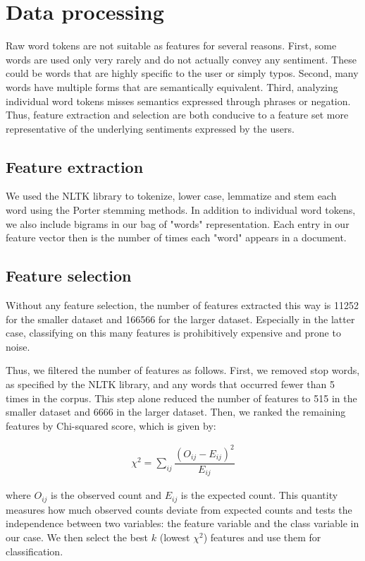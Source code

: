 \documentclass{article} %
\begin{document}
\section{Data processing}

Raw word tokens are not suitable as features for several reasons. First, some words are used only very rarely and do not actually convey any sentiment. These could be words that are highly specific to the user or simply typos. Second, many words have multiple forms that are semantically equivalent. Third, analyzing individual word tokens misses semantics expressed through phrases or negation. Thus, feature extraction and selection are both conducive to a feature set more representative of the underlying sentiments expressed by the users.

\subsection{Feature extraction}

We used the NLTK library to tokenize, lower case, lemmatize and stem each word using the Porter stemming methods. In addition to individual word tokens, we also include bigrams in our bag of "words" representation. Each entry in our feature vector then is the number of times each "word" appears in a document.

\subsection{Feature selection}

Without any feature selection, the number of features extracted this way is 11252 for the smaller dataset and 166566 for the larger dataset. Especially in the latter case, classifying on this many features is prohibitively expensive and prone to noise.

Thus, we filtered the number of features as follows. First, we removed stop words, as specified by the NLTK library, and any words that occurred fewer than 5 times in the corpus. This step alone reduced the number of features to 515 in the smaller dataset and 6666 in the larger dataset. Then, we ranked the remaining features by Chi-squared score, which is given by:

\begin{align*}
\chi^2 = \sum_{ij}{\dfrac{(O_{ij} - E_{ij})^2}{E_{ij}}}
\end{align*}

where $O_{ij}$ is the observed count and $E_{ij}$ is the expected count. This quantity measures how much observed counts deviate from expected counts and tests the independence between two variables: the feature variable and the class variable in our case. We then select the best $k$ (lowest $\chi^2$) features and use them for classification.
\end{document}
